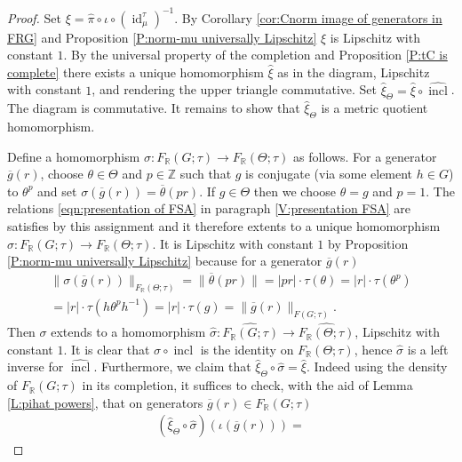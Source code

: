 \documentclass[12pt]{amsart}
\theoremstyle{definition}
\def\RR{\ensuremath{\mathbb{R}}}
\def\ZZ{\ensuremath{\mathbb{Z}}}
\newcommand{\OP}[1]{\operatorname{#1}}
\def\Free{F}
\begin{document}
\begin{proof}
Set $\xi =  \hat{\pi} \circ \iota \circ {({\OP{id}^\tau_\mu})^{-1}}$.
By Corollary \ref{cor:Cnorm image of generators in FRG} and Proposition \ref{P:norm-mu universally Lipschitz} $\xi$ is Lipschitz with constant $1$.
By the universal property of the completion and Proposition \ref{P:tC is complete} there exists a unique homomorphism $\hat{\xi}$ as in the diagram, Lipschitz with constant $1$, and rendering the  upper triangle commutative.
Set $\hat{\xi}_\Theta = \hat{\xi} \circ \widehat{\OP{incl}}$.
The diagram is commutative.
It remains to show that $\hat{\xi}_\Theta$ is a metric quotient homomorphism.

Define a homomorphism $\sigma \colon \Free_\RR(G;\tau) \to \Free_\RR(\Theta;\tau)$ as follows.
For a generator $\overline{g}(r)$, choose $\theta \in \Theta$ and $p \in \ZZ$ such that $g$ is conjugate (via some element $h \in G$) to $\theta^p$ and set $\sigma(\overline{g}(r)) = \overline{\theta}(pr)$.
If $g \in \Theta$ then we choose $\theta = g$ and $p=1$.
The relations \eqref{eqn:presentation of FSA} in paragraph \ref{V:presentation FSA} are satisfies by this assignment and it therefore extents to a unique homomorphism $\sigma \colon \Free_\RR(G;\tau) \to \Free_\RR(\Theta;\tau)$.
It is Lipschitz with constant $1$ by Proposition \ref{P:norm-mu universally Lipschitz} because for a generator $\overline{g}(r)$ %
\begin{multline*}
\|\sigma(\overline{g}(r))\|_{\Free_\RR(\Theta;\tau)} = \|\overline{\theta}(pr)\| = |pr| \cdot \tau(\theta) = |r| \cdot \tau(\theta^{p}) 
\\
= |r| \cdot \tau(h\theta^p h^{-1}) 
= |r| \cdot \tau(g) = \|\overline{g}(r)\|_{\Free(G;\tau)}.
\end{multline*}
Then $\sigma$ extends to a homomorphism $\widehat{\sigma} \colon \widehat{\Free_\RR(G;\tau)} \to \widehat{\Free_\RR(\Theta;\tau)}$, Lipschitz with constant $1$.
It is clear that $\sigma \circ \OP{incl}$ is the identity on $\Free_\RR(\Theta;\tau)$, hence $\widehat{\sigma}$ is a left inverse for $\widehat{\OP{incl}}$.
Furthermore, we claim that $\hat{\xi}_{\Theta} \circ \widehat{\sigma}= \hat{\xi}$.
Indeed using the density of $\Free_\RR(G;\tau)$ in its completion, it suffices to check, with the aid of Lemma \ref{L:pihat powers}, that on generators $\overline{g}(r) \in \Free_\RR(G;\tau)$
\begin{multline*}
(\hat{\xi}_\Theta \circ \widehat{\sigma})(\iota(\overline{g}(r))) =

\end{multline*}
\end{proof}
\end{document}
